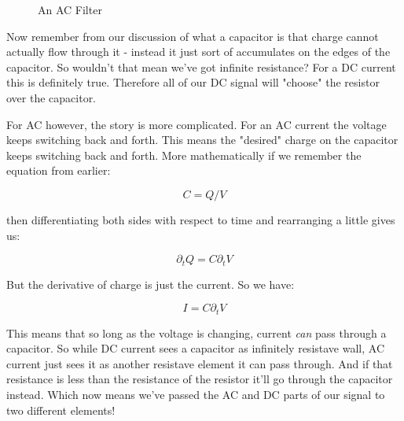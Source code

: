 \documentclass[10pt,a5paper]{book}
\begin{document}
\begin{figure}[!htb]
\caption{\label{fig:my-label} An AC Filter}
\end{figure}

Now remember from our discussion of what a capacitor is that charge cannot actually flow through it - instead it just sort of accumulates on the edges of the capacitor. So wouldn't that mean we've got infinite resistance? For a DC current this is definitely true. Therefore all of our DC signal will "choose" the resistor over the capacitor. 

For AC however, the story is more complicated. For an AC current the voltage keeps switching back and forth. This means the "desired" charge on the capacitor keeps switching back and forth. More mathematically if we remember the equation from earlier:

\begin{equation}
C = Q/V
\end{equation}

then differentiating both sides with respect to time and rearranging a little gives us:

\begin{equation}
\partial_t Q = C \partial_t V
\end{equation}

But the derivative of charge is just the current. So we have:

\begin{equation}
I = C \partial_t V
\end{equation}

This means that so long as the voltage is changing, current \textit{can} pass through a capacitor. So while DC current sees a capacitor as infinitely resistave wall, AC current just sees it as another resistave element it can pass through. And if that resistance is less than the resistance of the resistor it'll go through the capacitor instead. Which now means we've passed the AC and DC parts of our signal to two different elements! 
\end{document}
